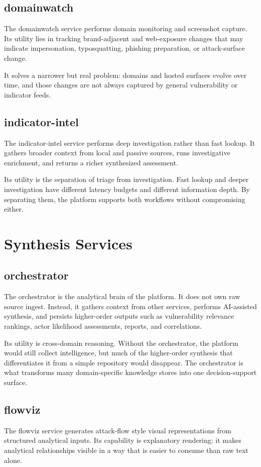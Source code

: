 \subsection{domainwatch}
The domainwatch service performs domain monitoring and screenshot capture. Its utility lies in tracking brand-adjacent and web-exposure changes that may indicate impersonation, typosquatting, phishing preparation, or attack-surface change.

It solves a narrower but real problem: domains and hosted surfaces evolve over time, and those changes are not always captured by general vulnerability or indicator feeds.

\subsection{indicator-intel}
The indicator-intel service performs deep investigation rather than fast lookup. It gathers broader context from local and passive sources, runs investigative enrichment, and returns a richer synthesized assessment.

Its utility is the separation of triage from investigation. Fast lookup and deeper investigation have different latency budgets and different information depth. By separating them, the platform supports both workflows without compromising either.

\section{Synthesis Services}
\subsection{orchestrator}
The orchestrator is the analytical brain of the platform. It does not own raw source ingest. Instead, it gathers context from other services, performs AI-assisted synthesis, and persists higher-order outputs such as vulnerability relevance rankings, actor likelihood assessments, reports, and correlations.

Its utility is cross-domain reasoning. Without the orchestrator, the platform would still collect intelligence, but much of the higher-order synthesis that differentiates it from a simple repository would disappear. The orchestrator is what transforms many domain-specific knowledge stores into one decision-support surface.

\subsection{flowviz}
The flowviz service generates attack-flow style visual representations from structured analytical inputs. Its capability is explanatory rendering: it makes analytical relationships visible in a way that is easier to consume than raw text alone.

